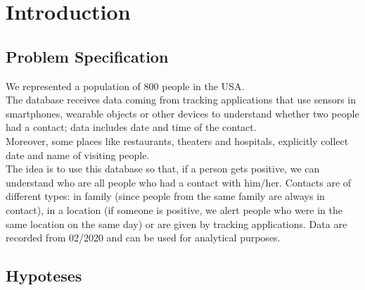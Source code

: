 \documentclass[12pt, a4paper]{article}
\begin{document}
\clearpage

\tableofcontents

\listoftodos

\clearpage

\section{Introduction}

\subsection{Problem Specification}

We represented a population of 800 people in the USA. \\
The database receives data coming from tracking applications that use sensors in 
smartphones, wearable objects or other devices to understand whether two people 
had a contact; data includes date and time of the contact. \\  
Moreover, some places like restaurants, theaters and hospitals, explicitly 
collect date and name of visiting people. \\
The idea is to use this database so that, if a person gets positive, we can 
understand who are all people who had a contact with him/her. Contacts are of 
different types: in family (since people from the same family are always in 
contact), in a location (if someone is positive, we alert people who were in 
the same location on the same day) or are given by tracking applications. 
Data are recorded from 02/2020 and can be used for analytical purposes. 

\subsection{Hypoteses}
\end{document}
